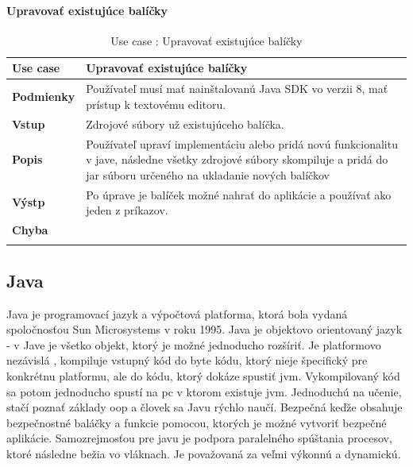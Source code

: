 \paragraph{Upravovať existujúce balíčky}
\begin{center}
	\begin{longtable}{|p{2.5cm}|p{14cm}|}
		
			\hline
			\textbf{Use case} & Upravovať existujúce balíčky \\ 
			\hline
			\textbf{Podmienky} &  Používateľ musí mať nainštalovanú Java SDK vo verzii 8, mať prístup k textovému editoru.  \\ 
			\hline
			\textbf{Vstup} & Zdrojové súbory už existujúceho balíčka.\\
			\hline
			\textbf{Popis} & Používateľ upraví implementáciu alebo pridá novú funkcionalitu v jave, následne všetky zdrojové súbory skompiluje a pridá do jar súboru určeného na ukladanie nových balíčkov\\ 
			\hline
			\textbf{Výstp} & Po úprave je balíček možné nahrať do aplikácie a používať ako jeden z príkazov.\\
			\hline
			\textbf{Chyba} & \\
			\hline
		\caption{Use case : Upravovať existujúce balíčky}
		\label{table:1}
		
	\end{longtable}
\end{center}
\subsection{Java}
\indent Java je programovací jazyk a výpočtová platforma, ktorá bola vydaná spoločnosťou Sun Microsystems v roku 1995. \cite{java} 
Java je objektovo orientovaný jazyk - v Jave je všetko objekt, ktorý je možné jednoducho rozšíriť. Je platformovo nezávislá , kompiluje vstupný kód do byte kódu, ktorý nieje špecifický pre konkrétnu platformu, ale do kódu, ktorý dokáze spustiť \gls{jvm}. Vykompilovaný kód sa potom jednoducho spustí na pc v ktorom existuje \gls{jvm}. Jednoduchú na učenie, stačí poznať základy \gls{oop} a človek sa Javu rýchlo naučí. Bezpečná keďže obsahuje  bezpečnostné baláčky a funkcie pomocou, ktorých je možné vytvoriť bezpečné aplikácie. Samozrejmosťou pre javu je podpora paralelného spúštania procesov, ktoré následne bežia vo vláknach. Je považovaná za veľmi výkonnú a dynamickú.\cite{javatut}


